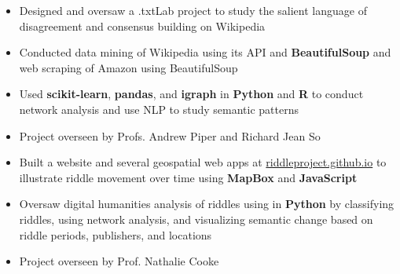 \documentclass[10pt,ragged2e]{altacv}
\begin{document}
\tagline{}

\begin{fullwidth}
\makecvheader
\end{fullwidth}



\begin{itemize}
\item Designed and oversaw a .txtLab project to study the salient language of disagreement and consensus building on Wikipedia
\item Conducted data mining of Wikipedia using its API and \textbf{BeautifulSoup} and web scraping of Amazon using BeautifulSoup
\item Used \textbf{scikit-learn}, \textbf{pandas}, and \textbf{igraph} in \textbf{Python} and \textbf{R} to conduct network analysis and use NLP to study semantic patterns
\item Project overseen by Profs. Andrew Piper and Richard Jean So
\end{itemize}

\divider

\begin{itemize}
\item Built a website and several geospatial web apps at {\href{https://riddleproject.github.io/}{riddleproject.github.io}} to illustrate riddle movement over time using \textbf{MapBox} and \textbf{JavaScript}
\item Oversaw digital humanities analysis of riddles using in \textbf{Python} by classifying riddles, using network analysis, and visualizing semantic change based on riddle periods, publishers, and locations
\item Project overseen by Prof. Nathalie Cooke
\end{itemize}
\end{document}
